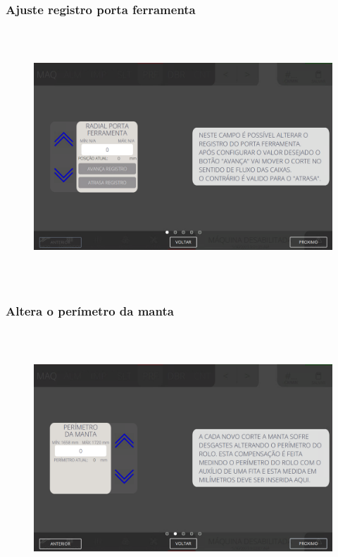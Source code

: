 \subsubsection{\small{Ajuste registro porta ferramenta}}\label{telaAjustesPerfuradoraAjusteRegistroPortaFerramenta}
\vspace*{\fill}
\begin{figure}[h]
  \centering
  \includegraphics[width=576px,height=360px]{src/imagesFlexo/06-drilling/settings/e-1.png}
\end{figure}
\vspace*{\fill}

\newpage
\thispagestyle{fancy}
\vspace*{40 pt}
\subsubsection{\small{Altera o perímetro da manta}}\label{telaAjustesPerfuradoraAlteraPerimetroManta}
\vspace*{\fill}
\begin{figure}[h]
  \centering
  \includegraphics[width=576px,height=360px]{src/imagesFlexo/06-drilling/settings/e-2.png}
\end{figure}
\vspace*{\fill}

